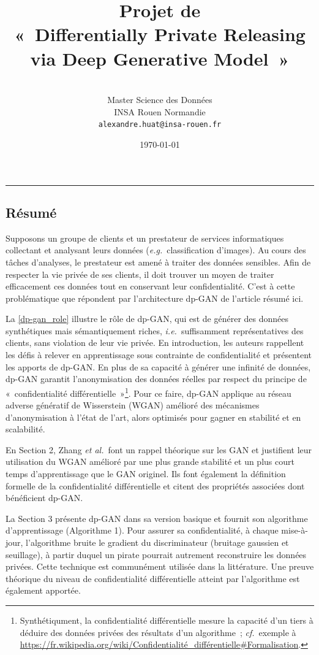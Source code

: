 \documentclass[a4paper,11pt]{article}
\title{\textbf{Projet de \DL}\\« Differentially Private Releasing via Deep Generative Model »}
\author{\textbf{\AH}\\Master Science des Données\\INSA Rouen Normandie\\\texttt{alexandre.huat@insa-rouen.fr}}
\date{\today}
\theoremstyle{definition}
\newcommand{\eg}{\textit{e.g.}}
\newcommand{\ie}{\textit{i.e.}}
\newcommand{\etal}{\textit{et al.}}
\newcommand{\cf}{\textit{cf.}}
\begin{document}
\maketitle
\hrule

\begin{multicols}{2}
\section{Résumé}
Supposons un groupe de clients et un prestateur de services informatiques collectant et analysant leurs données (\eg\ classification d'images). Au cours des tâches d'analyses, le prestateur est amené à traiter des données sensibles. Afin de respecter la vie privée de ses clients, il doit trouver un moyen de traiter efficacement ces données tout en conservant leur confidentialité. C'est à cette problématique que répondent \citet{ref} par l'architecture dp-GAN de l'article résumé ici.

La \autoref{dp-gan_role} illustre le rôle de dp-GAN, qui est de générer des données synthétiques mais sémantiquement riches, \ie\ suffisamment représentatives des clients, sans violation de leur vie privée.
En introduction, les auteurs rappellent les défis à relever en apprentissage sous contrainte de confidentialité et présentent les apports de dp-GAN. En plus de sa capacité à générer une infinité de données, dp-GAN garantit l'anonymisation des données réelles par respect du principe de « confidentialité différentielle »\footnote{Synthétiqument, la confidentialité différentielle mesure la capacité d'un tiers à déduire des données privées des résultats d'un algorithme ; \cf\ exemple à \url{https://fr.wikipedia.org/wiki/Confidentialité_différentielle#Formalisation}.}.
Pour ce faire, dp-GAN applique au réseau adverse génératif de Wisserstein (WGAN) amélioré des mécanismes d'anonymisation à l'état de l'art, alors optimisés pour gagner en stabilité et en scalabilité.

En Section 2, Zhang \etal\ font un rappel théorique sur les GAN et justifient leur utilisation du WGAN amélioré par une plus grande stabilité et un plus court temps d'apprentissage que le GAN originel. Ils font également la définition formelle de la confidentialité différentielle et citent des propriétés associées dont bénéficient dp-GAN.

La Section 3 présente dp-GAN dans sa version basique et fournit son algorithme d'apprentissage (Algorithme 1). Pour assurer sa confidentialité, à chaque mise-à-jour, l'algorithme bruite le gradient du discriminateur (bruitage gaussien et seuillage), à partir duquel un pirate pourrait autrement reconstruire les données privées. Cette technique est communément utilisée dans la littérature. Une preuve théorique du niveau de confidentialité différentielle atteint par l'algorithme est également apportée.


\end{multicols}
\end{document}
